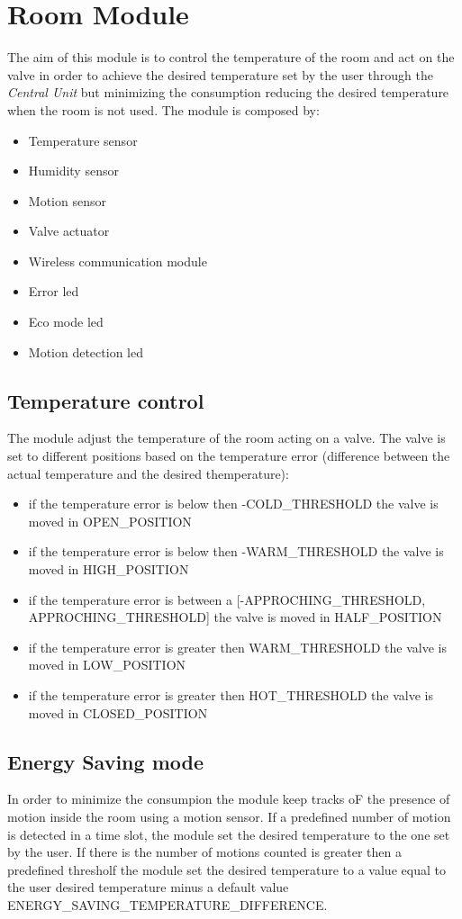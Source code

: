 \section{Room Module}
The aim of this module is to control the temperature of the room and act on the valve in order to 
achieve the desired temperature set by the user through the \textit{Central Unit} but minimizing the consumption
reducing the desired temperature when the room is not used.
\newline
The module is composed by:
\begin{itemize}
	\item Temperature sensor
	\item Humidity sensor
	\item Motion sensor
	\item Valve actuator
	\item Wireless communication module
	\item Error led
	\item Eco mode led
	\item Motion detection led
\end{itemize}

\subsection{Temperature control}
The module adjust the temperature of the room acting on a valve.
The valve is set to different positions based on the temperature error (difference between the actual temperature and the desired themperature):
\begin{itemize}
	\item if the temperature error is below then -COLD\_THRESHOLD the valve is moved in OPEN\_POSITION
	\item if the temperature error is below then -WARM\_THRESHOLD the valve is moved in HIGH\_POSITION
	\item if the temperature error is between a [-APPROCHING\_THRESHOLD, APPROCHING\_THRESHOLD] the valve is moved in HALF\_POSITION
	\item if the temperature error is greater then WARM\_THRESHOLD the valve is moved in LOW\_POSITION
	\item if the temperature error is greater then HOT\_THRESHOLD the valve is moved in CLOSED\_POSITION
\end{itemize}

\subsection{Energy Saving mode}
In order to minimize the consumpion the module keep tracks oF the presence of motion inside the room
using a motion sensor.
If a predefined number of motion is detected in a time slot, the module set the desired temperature to the one set by the user.
If there is the number of motions counted is greater then a predefined thresholf the module set the desired temperature 
to a value equal to the user desired temperature minus a default value ENERGY\_SAVING\_TEMPERATURE\_DIFFERENCE.

